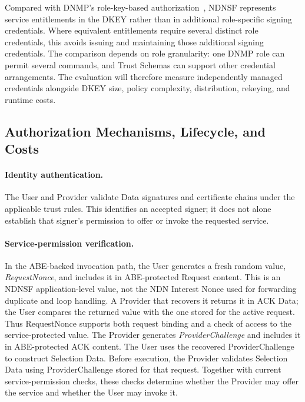 Compared with DNMP's role-key-based authorization~\cite{dnmp}, NDNSF represents
service entitlements in the DKEY rather than in additional role-specific signing
credentials. Where equivalent entitlements require several distinct role
credentials, this avoids issuing and maintaining those additional signing
credentials. The comparison depends on role granularity: one DNMP role can
permit several commands, and Trust Schemas can support other credential
arrangements. The evaluation will therefore measure independently managed
credentials alongside DKEY size, policy complexity, distribution, rekeying,
and runtime costs.

\subsection{Authorization Mechanisms, Lifecycle, and Costs}
\label{sec:authorization-withdrawal}

\paragraph{Identity authentication.}
The User and Provider validate Data signatures and certificate chains under
the applicable trust rules. This identifies an accepted signer; it does not
alone establish that signer's permission to offer or invoke the requested service.

\paragraph{Service-permission verification.}
In the ABE-backed invocation path, the User generates a fresh random value,
\emph{RequestNonce}, and includes it in ABE-protected Request content.
This is an NDNSF application-level value, not the NDN Interest Nonce used for
forwarding duplicate and loop handling.
A Provider that recovers it returns it in ACK Data; the User compares the
returned value with the one stored for the active request. Thus RequestNonce
supports both request binding and a check of access to the service-protected value.
The Provider generates \emph{ProviderChallenge} and includes it in ABE-protected
ACK content. The User uses the recovered ProviderChallenge to construct
Selection Data. Before execution, the Provider validates Selection Data using
ProviderChallenge stored for that request. Together with current service-permission
checks, these checks determine whether the Provider may offer the service and
whether the User may invoke it.

